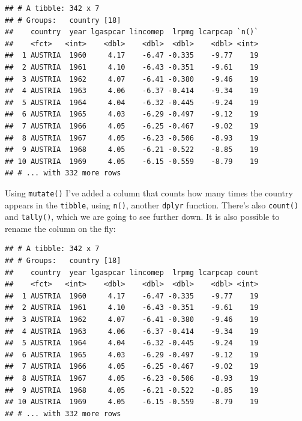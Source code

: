 \documentclass[]{gitbook}
\newenvironment{Shaded}{\begin{snugshade}}{\end{snugshade}}
\newcommand{\DataTypeTok}[1]{\textcolor[rgb]{0.13,0.29,0.53}{#1}}
\newcommand{\KeywordTok}[1]{\textcolor[rgb]{0.13,0.29,0.53}{\textbf{#1}}}
\newcommand{\NormalTok}[1]{#1}
\newcommand{\OperatorTok}[1]{\textcolor[rgb]{0.81,0.36,0.00}{\textbf{#1}}}
\newcommand{\StringTok}[1]{\textcolor[rgb]{0.31,0.60,0.02}{#1}}
\theoremstyle{definition}
\theoremstyle{definition}
\theoremstyle{definition}
\theoremstyle{remark}
\begin{document}
\begin{verbatim}
## # A tibble: 342 x 7
## # Groups:   country [18]
##    country  year lgaspcar lincomep  lrpmg lcarpcap `n()`
##    <fct>   <int>    <dbl>    <dbl>  <dbl>    <dbl> <int>
##  1 AUSTRIA  1960     4.17    -6.47 -0.335    -9.77    19
##  2 AUSTRIA  1961     4.10    -6.43 -0.351    -9.61    19
##  3 AUSTRIA  1962     4.07    -6.41 -0.380    -9.46    19
##  4 AUSTRIA  1963     4.06    -6.37 -0.414    -9.34    19
##  5 AUSTRIA  1964     4.04    -6.32 -0.445    -9.24    19
##  6 AUSTRIA  1965     4.03    -6.29 -0.497    -9.12    19
##  7 AUSTRIA  1966     4.05    -6.25 -0.467    -9.02    19
##  8 AUSTRIA  1967     4.05    -6.23 -0.506    -8.93    19
##  9 AUSTRIA  1968     4.05    -6.21 -0.522    -8.85    19
## 10 AUSTRIA  1969     4.05    -6.15 -0.559    -8.79    19
## # ... with 332 more rows
\end{verbatim}

Using \texttt{mutate()} I've added a column that counts how many times
the country appears in the \texttt{tibble}, using \texttt{n()}, another
\texttt{dplyr} function. There's also \texttt{count()} and
\texttt{tally()}, which we are going to see further down. It is also
possible to rename the column on the fly:

\begin{Shaded}
\end{Shaded}

\begin{verbatim}
## # A tibble: 342 x 7
## # Groups:   country [18]
##    country  year lgaspcar lincomep  lrpmg lcarpcap count
##    <fct>   <int>    <dbl>    <dbl>  <dbl>    <dbl> <int>
##  1 AUSTRIA  1960     4.17    -6.47 -0.335    -9.77    19
##  2 AUSTRIA  1961     4.10    -6.43 -0.351    -9.61    19
##  3 AUSTRIA  1962     4.07    -6.41 -0.380    -9.46    19
##  4 AUSTRIA  1963     4.06    -6.37 -0.414    -9.34    19
##  5 AUSTRIA  1964     4.04    -6.32 -0.445    -9.24    19
##  6 AUSTRIA  1965     4.03    -6.29 -0.497    -9.12    19
##  7 AUSTRIA  1966     4.05    -6.25 -0.467    -9.02    19
##  8 AUSTRIA  1967     4.05    -6.23 -0.506    -8.93    19
##  9 AUSTRIA  1968     4.05    -6.21 -0.522    -8.85    19
## 10 AUSTRIA  1969     4.05    -6.15 -0.559    -8.79    19
## # ... with 332 more rows
\end{verbatim}
\end{document}
